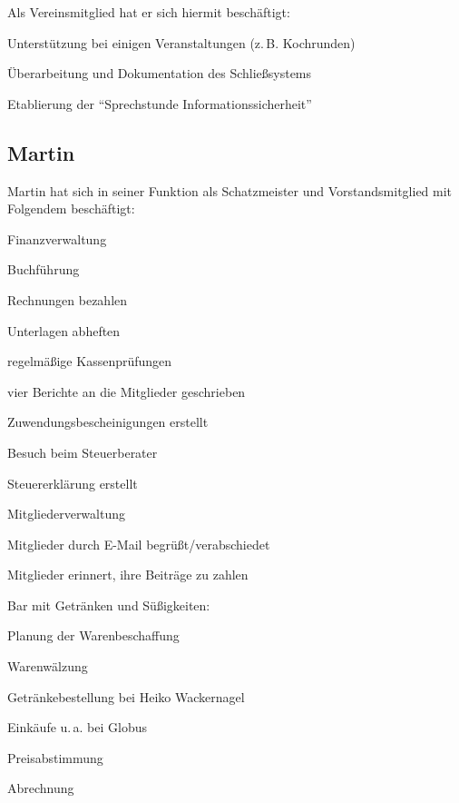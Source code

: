 \documentclass[ngerman]{scrartcl}
\begin{document}
Als Vereinsmitglied hat er sich hiermit beschäftigt: 

\begin{compactitem}
    \item Unterstützung bei einigen Veranstaltungen (z.\,B. Kochrunden)
    \item Überarbeitung und Dokumentation des Schließsystems
    \item Etablierung der "`Sprechstunde Informationssicherheit"'
\end{compactitem}

\subsection{Martin}
Martin hat sich in seiner Funktion als Schatzmeister und Vorstandsmitglied mit Folgendem beschäftigt:
\begin{compactitem}
	\item Finanzverwaltung
	\begin{compactitem}
		\item Buchführung
		\item Rechnungen bezahlen
		\item Unterlagen abheften
		\item regelmäßige Kassenprüfungen
		\item vier Berichte an die Mitglieder geschrieben
		\item Zuwendungsbescheinigungen erstellt
		\item Besuch beim Steuerberater
		\item Steuererklärung erstellt
	\end{compactitem}
	\item Mitgliederverwaltung
	\begin{compactitem}
		\item Mitglieder durch E-Mail begrüßt/verabschiedet
		\item Mitglieder erinnert, ihre Beiträge zu zahlen
	\end{compactitem}
	\item Bar mit Getränken und Süßigkeiten:
	\begin{compactitem}
		\item Planung der Warenbeschaffung
		\item Warenwälzung
		\item Getränkebestellung bei Heiko Wackernagel
		\item Einkäufe u.\,a. bei Globus
		\item Preisabstimmung
		\item Abrechnung

\end{compactitem}
\end{compactitem}
\end{document}
